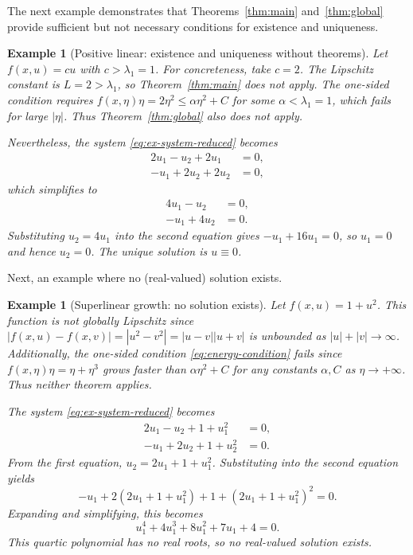\documentclass{article}
\newtheorem{example}[theorem]{Example}
\numberwithin{equation}{section}
\numberwithin{theorem}{section}
\begin{document}
The next example demonstrates that Theorems~\ref{thm:main} and~\ref{thm:global} provide sufficient but not necessary conditions for existence and uniqueness.

\begin{example}[Positive linear: existence and uniqueness without theorems]\label{ex:positive-linear}
Let $f(x, u) = cu$ with $c > \lambda_1 = 1$. For concreteness, take $c = 2$. The Lipschitz constant is $L = 2 > \lambda_1$, so Theorem~\ref{thm:main} does not apply. The one-sided condition requires $f(x, \eta)\eta = 2\eta^2 \leq \alpha\eta^2 + C$ for some $\alpha < \lambda_1 = 1$, which fails for large $|\eta|$. Thus Theorem~\ref{thm:global} also does not apply. 

Nevertheless, the system \eqref{eq:ex-system-reduced} becomes
\[\begin{aligned}
2u_1 - u_2 + 2u_1 &= 0,\\
-u_1 + 2u_2 + 2u_2 &= 0,
\end{aligned}\]
which simplifies to
\[\begin{aligned}
4u_1 - u_2 &= 0,\\
-u_1 + 4u_2 &= 0.
\end{aligned}\]
Substituting $u_2 = 4u_1$ into the second equation gives $-u_1 + 16u_1 = 0$, so $u_1 = 0$ and hence $u_2 = 0$. The unique solution is $u \equiv 0$.
\end{example}

Next, an example where no (real-valued) solution exists.
\begin{example}[Superlinear growth: no solution exists]\label{ex:no-solution}
Let $f(x, u) = 1 + u^2$. This function is not globally Lipschitz since $|f(x, u) - f(x, v)| = |u^2 - v^2| = |u - v||u + v|$
is unbounded as $|u| + |v| \to \infty$. Additionally, the one-sided condition \eqref{eq:energy-condition} fails since $f(x, \eta)\eta = \eta + \eta^3$ grows faster than $\alpha\eta^2 + C$ for any constants $\alpha, C$ as $\eta \to +\infty$. Thus neither theorem applies.

The system \eqref{eq:ex-system-reduced} becomes
\[\begin{aligned}
2u_1 - u_2 + 1 + u_1^2 &= 0,\\
-u_1 + 2u_2 + 1 + u_2^2 &= 0.
\end{aligned}\]
From the first equation, $u_2 = 2u_1 + 1 + u_1^2$. Substituting into the second equation yields
\[-u_1 + 2(2u_1 + 1 + u_1^2) + 1 + (2u_1 + 1 + u_1^2)^2 = 0.\]
Expanding and simplifying, this becomes
\[u_1^4 + 4u_1^3 + 8u_1^2 + 7u_1 + 4 = 0.\]
This quartic polynomial has no real roots, so no real-valued solution exists.
\end{example}
\end{document}
